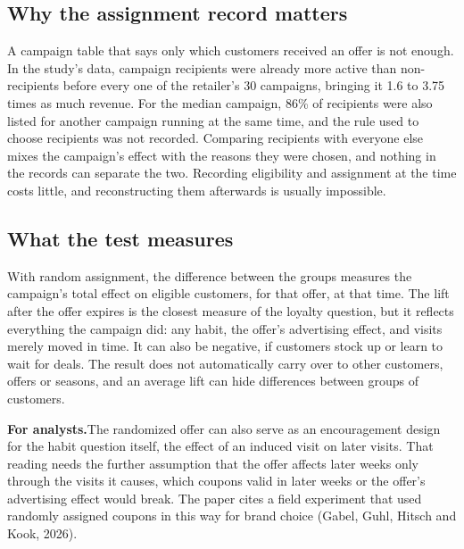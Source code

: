 \documentclass[11pt]{article}
\begin{document}
\subsection{Why the assignment record matters}
A campaign table that says only which customers received an offer is not enough. In the
study's data, campaign recipients were already more active than non-recipients before every
one of the retailer's 30 campaigns, bringing it 1.6 to 3.75 times as much revenue. For the
median campaign, 86\% of recipients were also listed for another campaign running at the same
time, and the rule used to choose recipients was not recorded. Comparing recipients with
everyone else mixes the campaign's effect with the reasons they were chosen, and nothing in the
records can separate the two. Recording eligibility and assignment at the time costs little,
and reconstructing them afterwards is usually impossible.

\subsection{What the test measures}
With random assignment, the difference between the groups measures the campaign's total effect
on eligible customers, for that offer, at that time. The lift after the offer expires is the
closest measure of the loyalty question, but it reflects everything the campaign did: any
habit, the offer's advertising effect, and visits merely moved in time. It can also be
negative, if customers stock up or learn to wait for deals. The result does not automatically
carry over to other customers, offers or seasons, and an average lift can hide differences
between groups of customers.

\vspace{1pt}
{\footnotesize\color{muted}\textbf{For analysts.}\enspace The randomized offer can also serve as
an encouragement design for the habit question itself, the effect of an induced visit on later
visits. That reading needs the further assumption that the offer affects later weeks only
through the visits it causes, which coupons valid in later weeks or the offer's advertising
effect would break. The paper cites a field experiment that used randomly assigned coupons in
this way for brand choice (Gabel, Guhl, Hitsch and Kook, 2026).\par}

\end{document}
